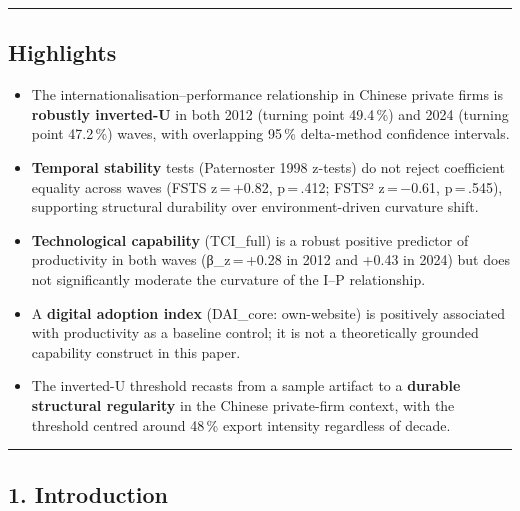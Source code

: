 \documentclass[12pt,a4paper]{article}
\providecommand{\tightlist}{\setlength{\itemsep}{0pt}\setlength{\parskip}{0pt}}
\begin{document}
\begin{center}\rule{0.5\linewidth}{0.5pt}\end{center}

\hypertarget{highlights}{%
\subsection{Highlights}\label{highlights}}

\begin{itemize}
\tightlist
\item
  The internationalisation--performance relationship in Chinese private
  firms is \textbf{robustly inverted-U} in both 2012 (turning point
  49.4\,\%) and 2024 (turning point 47.2\,\%) waves, with overlapping
  95\,\% delta-method confidence intervals.
\item
  \textbf{Temporal stability} tests (Paternoster 1998 z-tests) do not
  reject coefficient equality across waves (FSTS z\,=\,+0.82,
  p\,=\,.412; FSTS² z\,=\,−0.61, p\,=\,.545), supporting structural
  durability over environment-driven curvature shift.
\item
  \textbf{Technological capability} (TCI\_full) is a robust positive
  predictor of productivity in both waves (β\_z\,=\,+0.28 in 2012 and
  +0.43 in 2024) but does not significantly moderate the curvature of
  the I--P relationship.
\item
  A \textbf{digital adoption index} (DAI\_core: own-website) is
  positively associated with productivity as a baseline control; it is
  not a theoretically grounded capability construct in this paper.
\item
  The inverted-U threshold recasts from a sample artifact to a
  \textbf{durable structural regularity} in the Chinese private-firm
  context, with the threshold centred around 48\,\% export intensity
  regardless of decade.
\end{itemize}

\begin{center}\rule{0.5\linewidth}{0.5pt}\end{center}

\hypertarget{1-introduction}{%
\subsection{1. Introduction}\label{1-introduction}}
\end{document}
